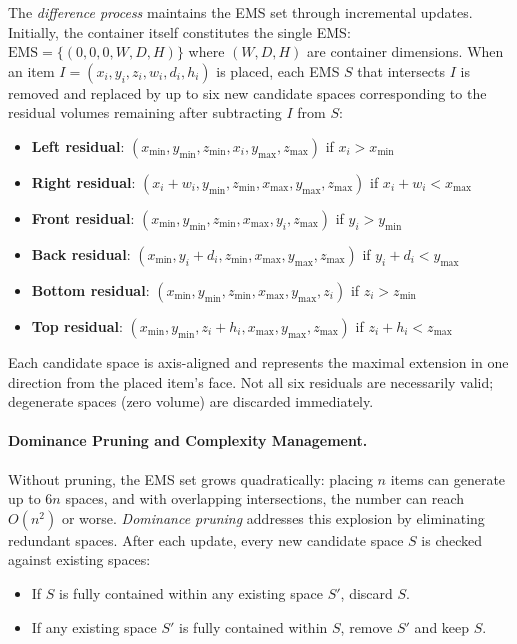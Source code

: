 The \textit{difference process} maintains the EMS set through incremental updates. Initially, the container itself constitutes the single EMS: $\text{EMS} = \{(0, 0, 0, W, D, H)\}$ where $(W, D, H)$ are container dimensions. When an item $I = (x_i, y_i, z_i, w_i, d_i, h_i)$ is placed, each EMS $S$ that intersects $I$ is removed and replaced by up to six new candidate spaces corresponding to the residual volumes remaining after subtracting $I$ from $S$:

\begin{itemize}
\item \textbf{Left residual}: $(x_{\min}, y_{\min}, z_{\min}, x_i, y_{\max}, z_{\max})$ if $x_i > x_{\min}$
\item \textbf{Right residual}: $(x_i + w_i, y_{\min}, z_{\min}, x_{\max}, y_{\max}, z_{\max})$ if $x_i + w_i < x_{\max}$
\item \textbf{Front residual}: $(x_{\min}, y_{\min}, z_{\min}, x_{\max}, y_i, z_{\max})$ if $y_i > y_{\min}$
\item \textbf{Back residual}: $(x_{\min}, y_i + d_i, z_{\min}, x_{\max}, y_{\max}, z_{\max})$ if $y_i + d_i < y_{\max}$
\item \textbf{Bottom residual}: $(x_{\min}, y_{\min}, z_{\min}, x_{\max}, y_{\max}, z_i)$ if $z_i > z_{\min}$
\item \textbf{Top residual}: $(x_{\min}, y_{\min}, z_i + h_i, x_{\max}, y_{\max}, z_{\max})$ if $z_i + h_i < z_{\max}$
\end{itemize}

Each candidate space is axis-aligned and represents the maximal extension in one direction from the placed item's face. Not all six residuals are necessarily valid; degenerate spaces (zero volume) are discarded immediately.

\paragraph{Dominance Pruning and Complexity Management.}
Without pruning, the EMS set grows quadratically: placing $n$ items can generate up to $6n$ spaces, and with overlapping intersections, the number can reach $O(n^2)$ or worse. \textit{Dominance pruning} addresses this explosion by eliminating redundant spaces. After each update, every new candidate space $S$ is checked against existing spaces:
\begin{itemize}
\item If $S$ is fully contained within any existing space $S'$, discard $S$.
\item If any existing space $S'$ is fully contained within $S$, remove $S'$ and keep $S$.
\end{itemize}

